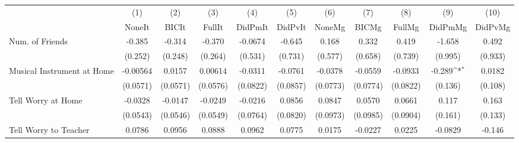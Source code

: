 {
\def\sym#1{\ifmmode^{#1}\else\(^{#1}\)\fi}
\begin{tabular}{l*{10}{c}}
\toprule
            &\multicolumn{1}{c}{(1)}&\multicolumn{1}{c}{(2)}&\multicolumn{1}{c}{(3)}&\multicolumn{1}{c}{(4)}&\multicolumn{1}{c}{(5)}&\multicolumn{1}{c}{(6)}&\multicolumn{1}{c}{(7)}&\multicolumn{1}{c}{(8)}&\multicolumn{1}{c}{(9)}&\multicolumn{1}{c}{(10)}\\
            &\multicolumn{1}{c}{NoneIt}&\multicolumn{1}{c}{BICIt}&\multicolumn{1}{c}{FullIt}&\multicolumn{1}{c}{DidPmIt}&\multicolumn{1}{c}{DidPvIt}&\multicolumn{1}{c}{NoneMg}&\multicolumn{1}{c}{BICMg}&\multicolumn{1}{c}{FullMg}&\multicolumn{1}{c}{DidPmMg}&\multicolumn{1}{c}{DidPvMg}\\
\midrule
Num. of Friends&      -0.385         &      -0.314         &      -0.370         &     -0.0674         &      -0.645         &       0.168         &       0.332         &       0.419         &      -1.658         &       0.492         \\
            &     (0.252)         &     (0.248)         &     (0.264)         &     (0.531)         &     (0.731)         &     (0.577)         &     (0.658)         &     (0.739)         &     (0.995)         &     (0.933)         \\
\addlinespace
Musical Instrument at Home&    -0.00564         &      0.0157         &     0.00614         &     -0.0311         &     -0.0761         &     -0.0378         &     -0.0559         &     -0.0933         &      -0.289\sym{*}  &      0.0182         \\
            &    (0.0571)         &    (0.0571)         &    (0.0576)         &    (0.0822)         &    (0.0857)         &    (0.0773)         &    (0.0774)         &    (0.0822)         &     (0.136)         &     (0.108)         \\
\addlinespace
Tell Worry at Home&     -0.0328         &     -0.0147         &     -0.0249         &     -0.0216         &      0.0856         &      0.0847         &      0.0570         &      0.0661         &       0.117         &       0.163         \\
            &    (0.0543)         &    (0.0546)         &    (0.0549)         &    (0.0764)         &    (0.0820)         &    (0.0973)         &    (0.0985)         &    (0.0904)         &     (0.161)         &     (0.133)         \\
\addlinespace
Tell Worry to Teacher&      0.0786         &      0.0956         &      0.0888         &      0.0962         &      0.0775         &      0.0175         &     -0.0227         &      0.0225         &     -0.0829         &      -0.146         \\

\end{tabular}}
